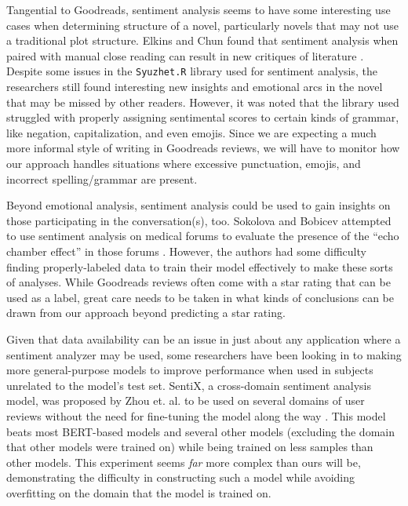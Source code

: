 Tangential to Goodreads, sentiment analysis seems to have some interesting use cases when determining structure of
a novel, particularly novels that may not use a traditional plot structure. Elkins and Chun found that sentiment
analysis when paired with manual close reading can result in new critiques of literature \cite{Elkins2019}. Despite
some issues in the \texttt{Syuzhet.R} library used for sentiment analysis, the researchers still found interesting
new insights and emotional arcs in the novel that may be missed by other readers. However, it was noted that the
library used struggled with properly assigning sentimental scores to certain kinds of grammar, like negation,
capitalization, and even emojis. Since we are expecting a much more informal style of writing in Goodreads
reviews, we will have to monitor how our approach handles situations where excessive punctuation, emojis, and
incorrect spelling/grammar are present.

Beyond emotional analysis, sentiment analysis could be used to gain insights on those participating in the
conversation(s), too. Sokolova and Bobicev attempted to use sentiment analysis on medical forums to evaluate
the presence of the ``echo chamber effect'' in those forums \cite{Sokolova2020}. However, the authors had some
difficulty finding properly-labeled data to train their model effectively to make these sorts of analyses.
While Goodreads reviews often come with a star rating that can be used as a label, great care needs to be
taken in what kinds of conclusions can be drawn from our approach beyond predicting a star rating.

Given that data availability can be an issue in just about any application where a sentiment analyzer may
be used, some researchers have been looking in to making more general-purpose models to improve performance
when used in subjects unrelated to the model's test set. SentiX, a cross-domain sentiment analysis model, was
proposed by Zhou et. al. to be used on several domains of user reviews without the need for fine-tuning the model
along the way \cite{Zhou2020}. This model beats most BERT-based models and several other models (excluding the domain that other
models were trained on) while being trained on less samples than other models. This experiment seems \textit{far} more
complex than ours will be, demonstrating the difficulty in constructing such a model while avoiding overfitting
on the domain that the model is trained on.


